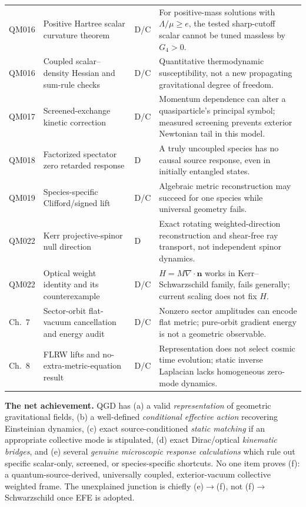 \documentclass[11pt,a4paper]{article}
\begin{document}
{\begin{longtable}{@{}p{.07\linewidth}p{.29\linewidth}p{.09\linewidth}p{.46\linewidth}@{}}
QM016 & Positive Hartree scalar curvature theorem & D/C & For positive-mass solutions with $\Lambda/\mu\ge e$, the tested sharp-cutoff scalar cannot be tuned massless by $G_4>0$.\\
QM016 & Coupled scalar--density Hessian and sum-rule checks & D/C & Quantitative thermodynamic susceptibility, not a new propagating gravitational degree of freedom.\\
QM017 & Screened-exchange kinetic correction & D/C & Momentum dependence can alter a quasiparticle's principal symbol; measured screening prevents exterior Newtonian tail in this model.\\
QM018 & Factorized spectator zero retarded response & D & A truly uncoupled species has no causal source response, even in initially entangled states.\\
QM019 & Species-specific Clifford/signed lift & D/C & Algebraic metric reconstruction may succeed for one species while universal geometry fails.\\
QM022 & Kerr projective-spinor null direction & D & Exact rotating weighted-direction reconstruction and shear-free ray transport, not independent spinor dynamics.\\
QM022 & Optical weight identity and its counterexample & D/C & $H=M\nabla\cdot\bm n$ works in Kerr--Schwarzschild family, fails generally; current scaling does not fix $H$.\\
Ch.~7 & Sector-orbit flat-vacuum cancellation and energy audit & D/C & Nonzero sector amplitudes can encode flat metric; pure-orbit gradient energy is not a geometric observable.\\
Ch.~8 & FLRW lifts and no-extra-metric-equation result & D/C & Representation does not select cosmic time evolution; static inverse Laplacian lacks homogeneous zero-mode dynamics.\\
\bottomrule
\end{longtable}}

\noindent\textbf{The net achievement.} QGD has (a) a valid \emph{representation} of geometric gravitational fields, (b) a well-defined \emph{conditional effective action} recovering Einsteinian dynamics, (c) exact source-conditioned \emph{static matching} if an appropriate collective mode is stipulated, (d) exact Dirac/optical \emph{kinematic bridges}, and (e) several \emph{genuine microscopic response calculations} which rule out specific scalar-only, screened, or species-specific shortcuts. No one item proves (f): a quantum-source-derived, universally coupled, exterior-vacuum collective weighted frame. The unexplained junction is chiefly (e)$\to$(f), not (f)$\to$Schwarzschild once EFE is adopted.
\end{document}
